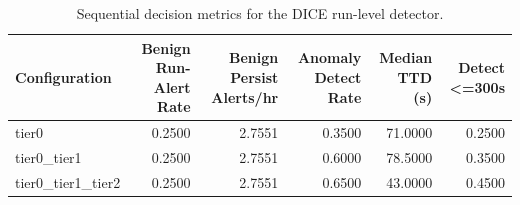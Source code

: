 \begin{table}[t]
\centering
\caption{Sequential decision metrics for the DICE run-level detector.}
\label{tab:dice_sequential_metrics}
\footnotesize
\begin{tabular}{lrrrrr}
\toprule
Configuration & Benign Run-Alert Rate & Benign Persist Alerts/hr & Anomaly Detect Rate & Median TTD (s) & Detect <=300s \\
\midrule
tier0 & 0.2500 & 2.7551 & 0.3500 & 71.0000 & 0.2500 \\
tier0_tier1 & 0.2500 & 2.7551 & 0.6000 & 78.5000 & 0.3500 \\
tier0_tier1_tier2 & 0.2500 & 2.7551 & 0.6500 & 43.0000 & 0.4500 \\
\bottomrule
\end{tabular}

\end{table}

